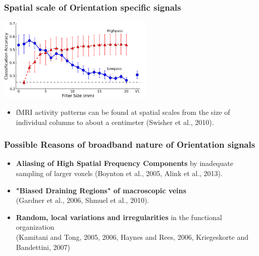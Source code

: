 \documentclass{beamer}
\begin{document}
  \begin{frame}
    \frametitle{Spatial scale of Orientation specific signals}
        \begin{center}
            \includegraphics[height=4cm]{pics/swisher}
        \end{center}
        \begin{itemize}
         \item fMRI activity patterns can be found at spatial scales 
         from the size of individual columns to about a centimeter 
         (Swisher et al., 2010).
        \end{itemize}  
    \end{frame}

  \begin{frame}
    \frametitle{Possible Reasons of broadband nature of Orientation signals}
        \begin{itemize}
         \item \textbf{Aliasing of High Spatial Frequency Components} by inadequate
         sampling of larger voxels (Boynton et al., 2005, Alink et al., 2013).
         \item \textbf{"Biased Draining Regions" of macroscopic veins} \\(Gardner et al., 2006, Shmuel et al., 2010).
         \item \textbf{Random, local variations and irregularities} 
         in the functional organization \\(Kamitani and Tong, 2005, 2006, 
         Haynes and Rees, 2006, Kriegeskorte and Bandettini, 2007)
        \end{itemize}  
    \end{frame}
\end{document}
